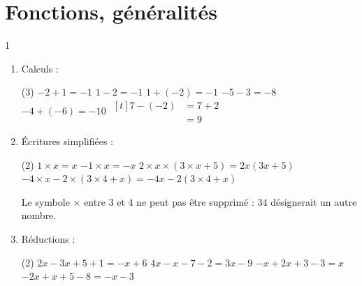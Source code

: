 \documentclass[10pt,a4paper]{article}
\begin{document}

\section{Fonctions, généralités}

\begin{corr}{1}
\begin{enumerate}[leftmargin=*]
    \item Calculs :
    \begin{tasks}(3)
        \task \(-2+1=-1\)
        \task \(1-2=-1\)
        \task \(1+(-2)=-1\)
        \task \(-5-3=-8\)
        \task \(-4+(-6)=-10\)
        \task \(\begin{aligned}[t] 7-(-2)&=7+2\\ &=9\end{aligned}\)
    \end{tasks}
    \item Écritures simplifiées :
    \begin{tasks}(2)
        \task \(1\times x=x\)
        \task \(-1\times x=-x\)
        \task \(2\times x\times(3\times x+5)=2x(3x+5)\)
        \task \(-4\times x-2\times(3\times 4+x)=-4x-2(3\times 4+x)\)
    \end{tasks}
    Le symbole \(\times\) entre \(3\) et \(4\) ne peut pas être supprimé : \(34\) désignerait un autre nombre.
    \item Réductions :
    \begin{tasks}(2)
        \task \(2x-3x+5+1=-x+6\)
        \task \(4x-x-7-2=3x-9\)
        \task \(-x+2x+3-3=x\)
        \task \(-2x+x+5-8=-x-3\)
    \end{tasks}
\end{enumerate}
\end{corr}
\end{document}
